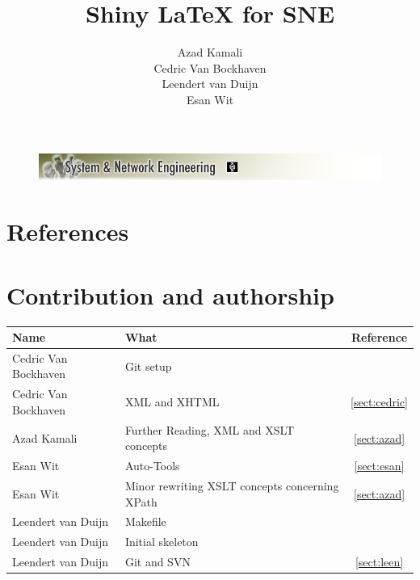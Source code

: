 \documentclass[a4paper,11pt] {article}
\title{Shiny \LaTeX{} for SNE\vspace{10pt}}
\author{
Azad Kamali\\
Cedric Van Bockhaven\\
Leendert van Duijn\\
Esan Wit\\
\vspace{10pt}
}
\begin{document}
\begin{titlepage}
	\enlargethispage{10cm}
	\begin{figure}[h]
	\includegraphics[width=1.0\textwidth]{images/SNELogo.png}
	\end{figure}
	{\let\newpage\relax\maketitle}
\end{titlepage}

\tableofcontents






\appendix
\section{References}



\section{Contribution and authorship}
\begin{tabular}{|l | l| c|}
\hline
Name& What&Reference\\
\hline

Cedric Van Bockhaven& Git setup&\\
Cedric Van Bockhaven&XML and XHTML&\ref{sect:cedric}\\
\hline
Azad Kamali& Further Reading, XML and XSLT concepts &\ref{sect:azad}\\
\hline
Esan Wit & Auto-Tools&\ref{sect:esan}\\
Esan Wit & Minor rewriting XSLT concepts concerning XPath&\ref{sect:azad}\\
\hline
Leendert van Duijn& Makefile&\\
Leendert van Duijn& Initial skeleton&\\
Leendert van Duijn& Git and SVN&\ref{sect:leen}\\
\hline
\end{tabular}
\end{document}
